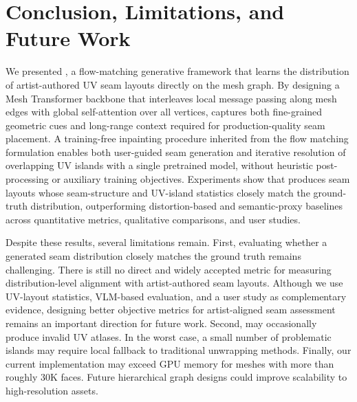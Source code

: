 \section{Conclusion, Limitations, and Future Work}
We presented \methodname{}, a flow-matching generative framework that learns the distribution of artist-authored UV seam layouts directly on the mesh graph. By designing a Mesh Transformer backbone that interleaves local message passing along mesh edges with global self-attention over all vertices, \methodname{} captures both fine-grained geometric cues and long-range context required for production-quality seam placement. A training-free inpainting procedure inherited from the flow matching formulation enables both user-guided seam generation and iterative resolution of overlapping UV islands with a single pretrained model, without heuristic post-processing or auxiliary training objectives. Experiments show that \methodname{} produces seam layouts whose seam-structure and UV-island statistics closely match the ground-truth distribution, outperforming distortion-based and semantic-proxy baselines across quantitative metrics, qualitative comparisons, and user studies.

Despite these results, several limitations remain. 
First, evaluating whether a generated seam distribution closely matches the ground truth remains challenging. 
There is still no direct and widely accepted metric for measuring distribution-level alignment with artist-authored seam layouts. 
Although we use UV-layout statistics, VLM-based evaluation, and a user study as complementary evidence, designing better objective metrics for artist-aligned seam assessment remains an important direction for future work.
Second, \methodname{} may occasionally produce invalid UV atlases. 
In the worst case, a small number of problematic islands may require local fallback to traditional unwrapping methods.
Finally, our current implementation may exceed GPU memory for meshes with more than roughly 30K faces. 
Future hierarchical graph designs could improve scalability to high-resolution assets.

